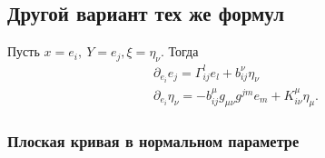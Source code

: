 
\subsection{Другой вариант тех же формул}
Пусть $x = e_i, \ Y = e_j, \xi = \eta_\nu$. Тогда
\begin{align*}
    \partial_{e_i} e_j = \Gamma_{ij}^{l} e_l + b_{ij}^\nu \eta_\nu \\ 
    \partial_{e_i} \eta_\nu = - b_{ij}^\mu g_{\mu \nu} g^{jm} e_m + K_{i\nu}^\mu \eta_\mu.
\end{align*}


\subsubsection*{Плоская кривая в нормальном параметре}


